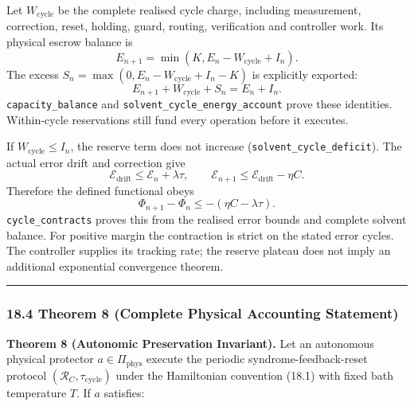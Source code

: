 \documentclass[
]{article}
\begin{document}
Let \(W_{\mathrm{cycle}}\) be the complete realised cycle charge,
including measurement, correction, reset, holding, guard, routing,
verification and controller work. Its physical escrow balance is \[
E_{n+1}=\min(K,E_n-W_{\mathrm{cycle}}+I_n).
\] The excess \(S_n=\max(0,E_n-W_{\mathrm{cycle}}+I_n-K)\) is explicitly
exported: \[
E_{n+1}+W_{\mathrm{cycle}}+S_n=E_n+I_n.
\] \texttt{capacity\_balance} and
\texttt{s\allowbreak{}o\allowbreak{}l\allowbreak{}v\allowbreak{}e\allowbreak{}n\allowbreak{}t\allowbreak{}\_\allowbreak{}c\allowbreak{}y\allowbreak{}c\allowbreak{}l\allowbreak{}e\allowbreak{}\_\allowbreak{}e\allowbreak{}n\allowbreak{}e\allowbreak{}r\allowbreak{}g\allowbreak{}y\allowbreak{}\_\allowbreak{}a\allowbreak{}c\allowbreak{}c\allowbreak{}o\allowbreak{}u\allowbreak{}n\allowbreak{}t}
prove these identities. Within-cycle reservations still fund every
operation before it executes.

If \(W_{\mathrm{cycle}}\le I_n\), the reserve term does not increase
(\texttt{s\allowbreak{}o\allowbreak{}l\allowbreak{}v\allowbreak{}e\allowbreak{}n\allowbreak{}t\allowbreak{}\_\allowbreak{}c\allowbreak{}y\allowbreak{}c\allowbreak{}l\allowbreak{}e\allowbreak{}\_\allowbreak{}d\allowbreak{}e\allowbreak{}f\allowbreak{}i\allowbreak{}c\allowbreak{}i\allowbreak{}t}).
The actual error drift and correction give \[
\mathcal E_{\mathrm{drift}}\le\mathcal E_n+\lambda\tau,\qquad
\mathcal E_{n+1}\le\mathcal E_{\mathrm{drift}}-\eta C.
\] Therefore the defined functional obeys \[
\Phi_{n+1}-\Phi_n\le-(\eta C-\lambda\tau).
\] \texttt{cycle\_contracts} proves this from the realised error bounds
and complete solvent balance. For positive margin the contraction is
strict on the stated error cycles. The controller supplies its tracking
rate; the reserve plateau does not imply an additional exponential
convergence theorem.

\begin{center}\rule{0.5\linewidth}{0.5pt}\end{center}

\subsubsection{18.4 Theorem 8 (Complete Physical Accounting
Statement)}\label{theorem-8-complete-physical-accounting-statement}

\textbf{Theorem 8 (Autonomic Preservation Invariant).} Let an autonomous
physical protector \(a \in \Pi_{\mathrm{phys}}\) execute the periodic
syndrome-feedback-reset protocol
\((\mathcal{R}_C, \tau_{\mathrm{cycle}})\) under the Hamiltonian
convention (18.1) with fixed bath temperature \(T\). If \(a\) satisfies:
\end{document}
